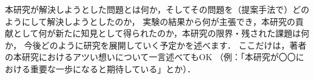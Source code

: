 本研究が解決しようとした問題とは何か，そしてその問題を（提案手法で）どのようにして解決しようとしたのか，
実験の結果から何が主張でき，本研究の貢献として何が新たに知見として得られたのか，本研究の限界・残された課題は何か，
今後どのように研究を展開していく予定かを述べます．
ここだけは，著者の本研究におけるアツい想いについて一言述べてもOK
（例：「本研究が〇〇における重要な一歩になると期待している」とか）．